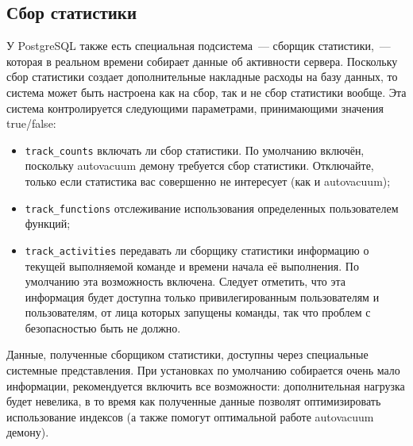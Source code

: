 \subsection{Сбор статистики}


У PostgreSQL также есть специальная подсистема~--- сборщик статистики,~--- которая в реальном времени собирает данные об активности сервера. Поскольку сбор статистики создает дополнительные накладные расходы на базу данных, то система может быть настроена как на сбор, так и не сбор статистики вообще. Эта система контролируется следующими параметрами, принимающими значения true/false:

\begin{itemize}
  \item \lstinline!track_counts! включать ли сбор статистики. По умолчанию включён, поскольку autovacuum демону требуется сбор статистики. Отключайте, только если статистика вас совершенно не интересует (как и autovacuum);
  \item \lstinline!track_functions! отслеживание использования определенных пользователем функций;
  \item \lstinline!track_activities! передавать ли сборщику статистики информацию о текущей выполняемой команде и времени начала её выполнения. По умолчанию эта возможность включена. Следует отметить, что эта информация будет доступна только привилегированным пользователям и пользователям, от лица которых запущены команды, так что проблем с безопасностью быть не должно.
\end{itemize}

Данные, полученные сборщиком статистики, доступны через специальные системные представления. При установках по умолчанию собирается очень мало информации, рекомендуется включить все возможности: дополнительная нагрузка будет невелика, в то время как полученные данные позволят оптимизировать использование индексов (а также помогут оптимальной работе autovacuum демону).
